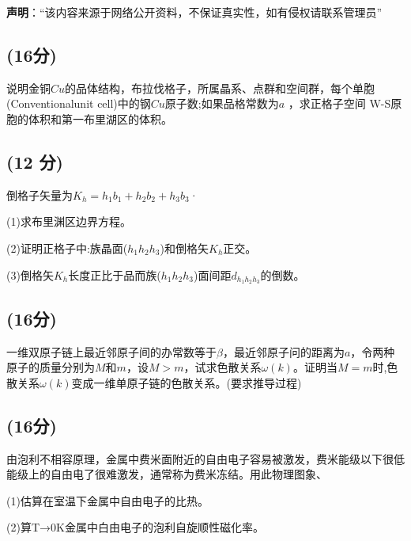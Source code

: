 
\textbf{声明}：“该内容来源于网络公开资料，不保证真实性，如有侵权请联系管理员”

\subsection{(16分)}
说明金铜$Cu$的品体结构，布拉伐格子，所属晶系、点群和空间群，每个单胞(Conventionalunit cell)中的钢$Cu$原子数;如果品格常数为$a$ ，求正格子空间 W-S原胞的体积和第一布里湖区的体积。
\subsection{(12 分)}
倒格子矢量为$K_h=h_1b_1+h_2b_2+h_3b_3$·

(1)求布里渊区边界方程。

(2)证明正格子中:族晶面($h_1h_2h_3$)和倒格矢$K_h$正交。

(3)倒格矢$K_h$长度正比于品而族($h_1h_2h_3$)面间距$d_{h_1h_2h_3}$的倒数。
\subsection{(16分)}
一维双原子链上最近邻原子间的办常数等于$\beta$，最近邻原子问的距离为$a$，令两种原子的质量分别为$M$和$m$，设$M>m$，试求色散关系$\omega(k)$。证明当$M=m$时,色散关系$\omega(k)$变成一维单原子链的色散关系。(要求推导过程)
\subsection{(16分)}
由泡利不相容原理，金属中费米面附近的自由电子容易被激发，费米能级以下很低能级上的自由电了很难激发，通常称为费米冻结。用此物理图象、

(1)估算在室温下金属中自由电子的比热。

(2)算T→0K金属中白由电子的泡利自旋顺性磁化率。
